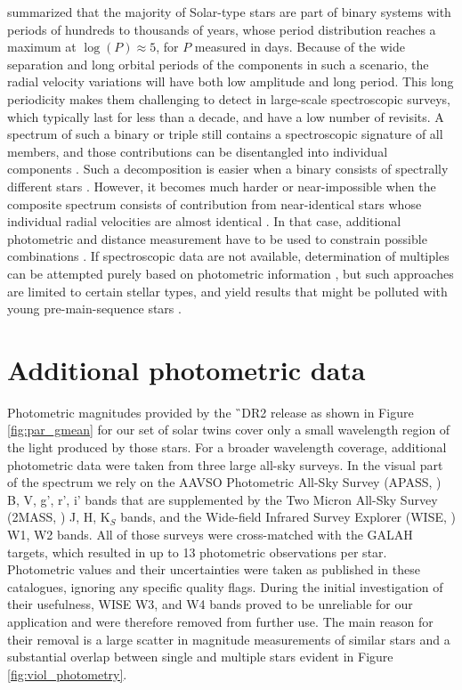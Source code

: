 \citet{2013ARA&A..51..269D} summarized that the majority of Solar-type stars are part of binary systems with periods of hundreds to thousands of years, whose period distribution reaches a maximum at $\log(P)\approx5$, for $P$ measured in days. Because of the wide separation and long orbital periods of the components in such a scenario, the radial velocity variations will have both low amplitude and long period. This long periodicity makes them challenging to detect in large-scale spectroscopic surveys, which typically last for less than a decade, and have a low number of revisits. A spectrum of such a binary or triple still contains a spectroscopic signature of all members, and those contributions can be disentangled into individual components \cite{2018MNRAS.473.5043E, 2018MNRAS.476..528E}. Such a decomposition is easier when a binary consists of spectrally different stars \cite{2005A&A...440..995S, 2007MNRAS.382.1377R, 2012MNRAS.419..806R, 2013AJ....146...82R, 2016MNRAS.458.3808R}. However, it becomes much harder or near-impossible when the composite spectrum consists of contribution from near-identical stars whose individual radial velocities are almost identical \cite{2015IJAsB..14..173B}. In that case, additional photometric and distance measurement have to be used to constrain possible combinations \cite{2018ApJ...857..114W}. If spectroscopic data are not available, determination of multiples can be attempted purely based on photometric information \cite{1997A&A...327..598F, 1998MNRAS.300..977H, 2016MNRAS.455.3009M, 2018ApJ...857..114W}, but such approaches are limited to certain stellar types, and yield results that might be polluted with young pre-main-sequence stars \cite{2018arXiv181010435Z}.

\section{Additional photometric data}
\label{sec:data_triples}
Photometric magnitudes provided by the \G\ DR2 release \cite{2016A&A...595A...1G, 2018A&A...616A...1G} as shown in Figure \ref{fig:par_gmean} for our set of solar twins cover only a small wavelength region of the light produced by those stars. For a broader wavelength coverage, additional photometric data were taken from three large all-sky surveys. In the visual part of the spectrum we rely on the AAVSO Photometric All-Sky Survey (APASS, \cite{2015AAS...22533616H}) B, V, g', r', i' bands that are supplemented by the Two Micron All-Sky Survey (2MASS, \cite{2006AJ....131.1163S}) J, H, K$_S$ bands, and the Wide-field Infrared Survey Explorer (WISE, \cite{2010AJ....140.1868W}) W1, W2 bands. All of those surveys were cross-matched with the GALAH targets, which resulted in up to 13 photometric observations per star. Photometric values and their uncertainties were taken as published in these catalogues, ignoring any specific quality flags. During the initial investigation of their usefulness, WISE W3, and W4 bands proved to be unreliable for our application and were therefore removed from further use. The main reason for their removal is a large scatter in magnitude measurements of similar stars and a substantial overlap between single and multiple stars evident in Figure \ref{fig:viol_photometry}.

